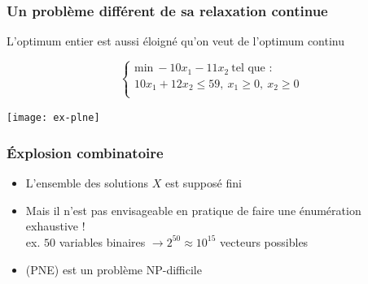 \documentclass{beamer}
\begin{document}
\begin{frame}
  \frametitle{Un problème différent de sa relaxation continue}

\alert{L'optimum entier est aussi éloigné qu'on veut de l'optimum continu}

  \[
  \left\{
  \begin{array}{c}
    \text{min} \ -10x_1 - 11x_2 \ \text{tel que :} \\
    10x_1 + 12x_2 \leq 59, \ x_1 \geq 0, \ x_2 \geq 0 \\
  \end{array}
  \right.
  \]

  \begin{center}
    \texttt{[image: ex-plne]}
  \end{center}
\end{frame}

\begin{frame}
  \frametitle{\'Explosion combinatoire}

  \begin{itemize}
  \item L'ensemble des solutions $X$ est supposé fini
  \item Mais il n'est pas envisageable en pratique de faire une énumération exhaustive ! \\
    ex. $50$ variables binaires $\rightarrow 2^{50} \approx 10^{15}$ vecteurs possibles  
  \item (PNE) est un problème NP-difficile
  \end{itemize}

\end{frame}
\end{document}
